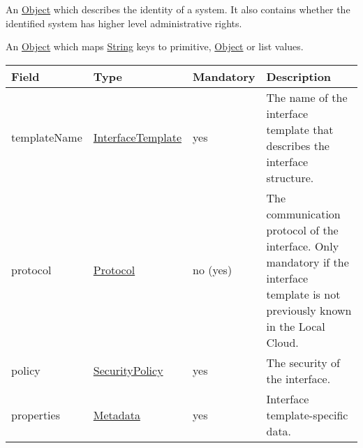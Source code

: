 \documentclass[a4paper]{arrowhead}
\newcommand{\pref}[1]{{\textcolor{ArrowheadGrey}{\hyperref[sec:model:primitives:#1]{#1}}}}
\begin{document}

An \pref{Object} which describes the identity of a system. It also contains whether the identified system has higher level administrative rights.


An \pref{Object} which maps \pref{String} keys to primitive, \pref{Object} or list values.


 
\begin{table}[ht!]
\begin{tabularx}{\textwidth}{| p{2.5cm} | p{3cm} | p{2cm} | X |} \hline
\rowcolor{gray!33} Field & Type & Mandatory & Description \\ \hline
templateName & \pref{InterfaceTemplate} & yes & The name of the interface template that describes the interface structure. \\ \hline
protocol & \pref{Protocol} & no (yes) & The communication protocol of the interface. Only mandatory if the interface template is not previously known in the Local Cloud.  \\ \hline
policy & \pref{SecurityPolicy} & yes & The security of the interface. \\ \hline
properties &\hyperref[sec:model:Metadata]{Metadata} & yes & Interface template-specific data. \\ \hline
\end{tabularx}
\end{table}

\clearpage

 
\end{document}
